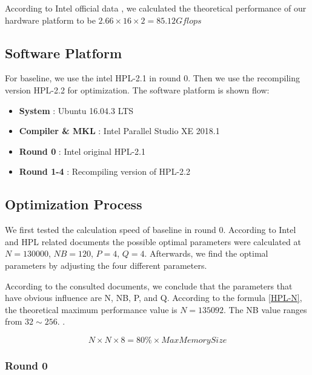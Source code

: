 \documentclass{mcmthesis}
\begin{document}
According to Intel official data , we calculated the theoretical performance of our hardware platform to be $2.66 \times 16 \times 2 = 85.12 Gflops$

\subsection{Software Platform}

\par For baseline, we use the intel HPL-2.1 in round 0. Then we use the recompiling version HPL-2.2 for optimization. The software platform is shown flow: 

\begin{itemize}
	\item \textbf{System} : Ubuntu 16.04.3 LTS
	\item \textbf{Compiler \& MKL} : Intel Parallel Studio XE 2018.1
	\item \textbf{Round 0} : Intel original HPL-2.1
	\item \textbf{Round 1-4} : Recompiling version of HPL-2.2
\end{itemize}

\subsection{Optimization Process}

\par We first tested the calculation speed of baseline in round 0. According to Intel and HPL related documents  the possible optimal parameters were calculated at $N = 130000$, $NB = 120$, $P = 4$, $Q = 4$. Afterwards, we find the optimal parameters by adjusting the four different parameters.

\par According to the consulted documents, we conclude that the parameters that have obvious influence are N, NB, P, and Q. According to the formula \ref{HPL-N}, the theoretical maximum performance value is $N=135092$. The NB value ranges from $32\sim256$. .

\begin{equation}
	\label{HPL-N}
	N \times N \times 8 = 80\% \times MaxMemorySize
\end{equation}


\subsubsection{Round 0}
\end{document}
